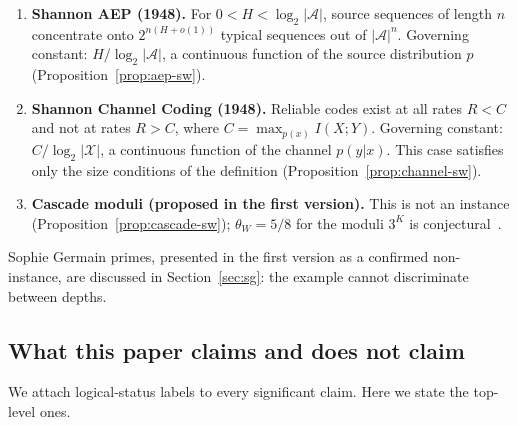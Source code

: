 \documentclass[12pt]{amsart}
\theoremstyle{plain}
\theoremstyle{definition}
\theoremstyle{remark}
\newcommand{\thetaW}{\theta_W}
\begin{document}
\begin{enumerate}
  \item \textbf{Shannon AEP (1948).} For $0 < H < \log_2|\mathcal{A}|$, source
    sequences of length $n$ concentrate onto $2^{n(H+o(1))}$ typical sequences
    out of $|\mathcal{A}|^n$. Governing constant: $H/\log_2|\mathcal{A}|$, a
    continuous function of the source distribution $p$
    (Proposition~\ref{prop:aep-sw}).

  \item \textbf{Shannon Channel Coding (1948).} Reliable codes exist at all rates
    $R < C$ and not at rates $R > C$, where $C = \max_{p(x)} I(X;Y)$. Governing
    constant: $C/\log_2|\mathcal{X}|$, a continuous function of the channel
    $p(y|x)$. This case satisfies only the size conditions of the definition
    (Proposition~\ref{prop:channel-sw}).

  \item \textbf{Cascade moduli (proposed in the first version).} This is not an
    instance (Proposition~\ref{prop:cascade-sw}); $\thetaW = 5/8$ for the moduli
    $3^K$ is conjectural~\cite{WakilEisenstein}.
\end{enumerate}

Sophie Germain primes, presented in the first version as a confirmed
non-instance, are discussed in Section~\ref{sec:sg}: the example cannot
discriminate between depths.

\subsection{What this paper claims and does not claim}
\label{sec:claims}

We attach logical-status labels to every significant claim. Here we state the
top-level ones.
\end{document}
